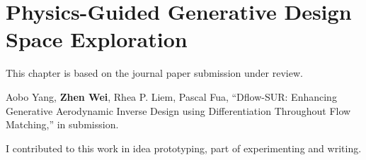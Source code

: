 \chapter{Physics-Guided Generative Design Space Exploration}
\label{ch7}

This chapter is based on the journal paper submission under review.

Aobo Yang, \textbf{Zhen Wei}, Rhea P. Liem, Pascal Fua, “Dflow-SUR: Enhancing Generative Aerodynamic Inverse Design using Differentiation Throughout Flow Matching,” in submission.

I contributed to this work in idea prototyping, part of experimenting and writing.






